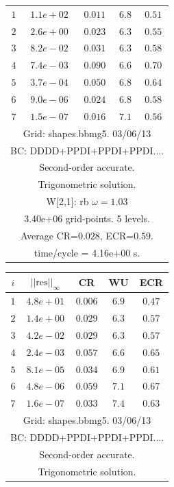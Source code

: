 \begin{table}[hbt]
\begin{center}
{\begin{tabular}{|c|c|c|c|c|}
 $ 1$  & $ 1.1e+02$ & $0.011$ & $ 6.8$ & $0.51$ \\ 
 $ 2$  & $ 2.6e+00$ & $0.023$ & $ 6.3$ & $0.55$ \\ 
 $ 3$  & $ 8.2e-02$ & $0.031$ & $ 6.3$ & $0.58$ \\ 
 $ 4$  & $ 7.4e-03$ & $0.090$ & $ 6.6$ & $0.70$ \\ 
 $ 5$  & $ 3.7e-04$ & $0.050$ & $ 6.8$ & $0.64$ \\ 
 $ 6$  & $ 9.0e-06$ & $0.024$ & $ 6.8$ & $0.58$ \\ 
 $ 7$  & $ 1.5e-07$ & $0.016$ & $ 7.1$ & $0.56$ \\ 
\hline 
\multicolumn{5}{|c|}{Grid: shapes.bbmg5. 03/06/13}  \\
\multicolumn{5}{|c|}{BC: DDDD+PPDI+PPDI+PPDI....}  \\
\multicolumn{5}{|c|}{Second-order accurate.}  \\
\multicolumn{5}{|c|}{Trigonometric solution.}  \\
\multicolumn{5}{|c|}{W[2,1]: rb $\omega=1.03$}  \\
\multicolumn{5}{|c|}{3.40e+06 grid-points. 5 levels.}  \\
\multicolumn{5}{|c|}{Average CR=$0.028$, ECR=$0.59$.}  \\
\multicolumn{5}{|c|}{time/cycle = 4.16e+00 s.}  \\
\hline 
\end{tabular}
\begin{tabular}{|c|c|c|c|c|} \hline 
 $i$   & $\vert\vert\mbox{res}\vert\vert_\infty$  &  CR     &  WU    & ECR  \\   \hline 
 $ 1$  & $ 4.8e+01$ & $0.006$ & $ 6.9$ & $0.47$ \\ 
 $ 2$  & $ 1.4e+00$ & $0.029$ & $ 6.3$ & $0.57$ \\ 
 $ 3$  & $ 4.2e-02$ & $0.029$ & $ 6.3$ & $0.57$ \\ 
 $ 4$  & $ 2.4e-03$ & $0.057$ & $ 6.6$ & $0.65$ \\ 
 $ 5$  & $ 8.1e-05$ & $0.034$ & $ 6.9$ & $0.61$ \\ 
 $ 6$  & $ 4.8e-06$ & $0.059$ & $ 7.1$ & $0.67$ \\ 
 $ 7$  & $ 1.6e-07$ & $0.033$ & $ 7.4$ & $0.63$ \\ 
\hline 
\multicolumn{5}{|c|}{Grid: shapes.bbmg5. 03/06/13}  \\
\multicolumn{5}{|c|}{BC: DDDD+PPDI+PPDI+PPDI....}  \\
\multicolumn{5}{|c|}{Second-order accurate.}  \\
\multicolumn{5}{|c|}{Trigonometric solution.}  \\

\end{tabular}}
\end{center}
\end{table}
